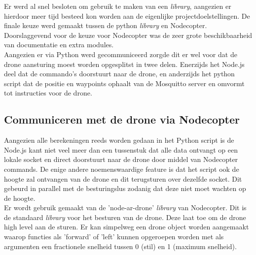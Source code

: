 Er werd al snel besloten om gebruik te maken van een \textit{library}, aangezien er hierdoor meer tijd besteed kon worden aan de eigenlijke projectdoelstellingen.
De finale keuze werd gemaakt tussen de python \textit{library} en Nodecopter.
Doorslaggevend voor de keuze voor Nodecopter was de zeer grote beschikbaarheid van documentatie en extra modules.\\
Aangezien er via Python werd gecommuniceerd zorgde dit er wel voor dat de drone aansturing moest worden opgesplitst in twee delen.
Enerzijds het Node.js deel dat de commando's doorstuurt naar de drone, en anderzijds het python script dat de positie en waypoints ophaalt van de Mosquitto server en omvormt tot instructies voor de drone.

\subsection{Communiceren met de drone via Nodecopter}
Aangezien alle berekeningen reeds worden gedaan in het Python script is de Node.js kant niet veel meer dan een tussenstuk dat alle data ontvangt op een lokale socket en direct doorstuurt naar de drone door middel van Nodecopter commands.
De enige andere noemenswaardige feature is dat het script ook de hoogte zal ontvangen van de drone en dit terugsturen over dezelfde socket.
Dit gebeurd in parallel met de besturingslus zodanig dat deze niet moet wachten op de hoogte.\\

Er wordt gebruik gemaakt van de 'node-ar-drone' \textit{library} van Nodecopter.
Dit is de standaard \textit{library} voor het besturen van de drone.
Deze laat toe om de drone high level aan de sturen.
Er kan simpelweg een drone object worden aangemaakt waarop functies als 'forward' of 'left' kunnen opgeroepen worden met als argumenten een fractionele snelheid tussen 0 (stil) en 1 (maximum snelheid).\\

